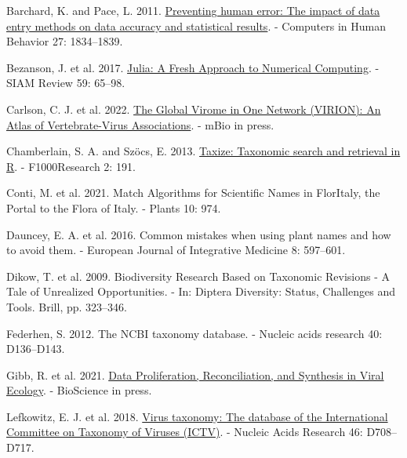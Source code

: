 \documentclass[11pt]{article}
\newlength{\cslhangindent}
\newenvironment{CSLReferences}[2] %
 {%
  \setlength{\parindent}{0pt}
  \ifodd #1 \everypar{\setlength{\hangindent}{\cslhangindent}}\ignorespaces\fi
  \ifnum #2 > 0
  \setlength{\parskip}{#2\baselineskip}
  \fi
 }%
 {}
\begin{document}
\hypertarget{refs}{}
\begin{CSLReferences}{1}{0}
\leavevmode{}%
Barchard, K. and Pace, L. 2011.
\href{https://doi.org/10.1016/j.chb.2011.04.004}{Preventing human error:
The impact of data entry methods on data accuracy and statistical
results}. - Computers in Human Behavior 27: 1834--1839.

\leavevmode{}%
Bezanson, J. et al. 2017.
\href{https://doi.org/10.1137/141000671}{Julia: A Fresh Approach to
Numerical Computing}. - SIAM Review 59: 65--98.

\leavevmode{}%
Carlson, C. J. et al. 2022.
\href{https://doi.org/10.1128/mbio.02985-21}{The Global Virome in One
Network (VIRION): An Atlas of Vertebrate-Virus Associations}. - mBio in
press.

\leavevmode{}%
Chamberlain, S. A. and Szöcs, E. 2013.
\href{https://doi.org/10.12688/f1000research.2-191.v2}{Taxize: Taxonomic
search and retrieval in R}. - F1000Research 2: 191.

\leavevmode{}%
Conti, M. et al. 2021. Match Algorithms for Scientific Names in
FlorItaly, the Portal to the Flora of Italy. - Plants 10: 974.

\leavevmode{}%
Dauncey, E. A. et al. 2016. Common mistakes when using plant names and
how to avoid them. - European Journal of Integrative Medicine 8:
597--601.

\leavevmode{}%
Dikow, T. et al. 2009. Biodiversity Research Based on Taxonomic
Revisions - A Tale of Unrealized Opportunities. - In: Diptera Diversity:
Status, Challenges and Tools. Brill, pp. 323--346.

\leavevmode{}%
Federhen, S. 2012. The NCBI taxonomy database. - Nucleic acids research
40: D136--D143.

\leavevmode{}%
Gibb, R. et al. 2021. \href{https://doi.org/10.1093/biosci/biab080}{Data
Proliferation, Reconciliation, and Synthesis in Viral Ecology}. -
BioScience in press.

\leavevmode{}%
Lefkowitz, E. J. et al. 2018.
\href{https://doi.org/10.1093/nar/gkx932}{Virus taxonomy: The database
of the International Committee on Taxonomy of Viruses (ICTV)}. - Nucleic
Acids Research 46: D708--D717.


\end{CSLReferences}
\end{document}
